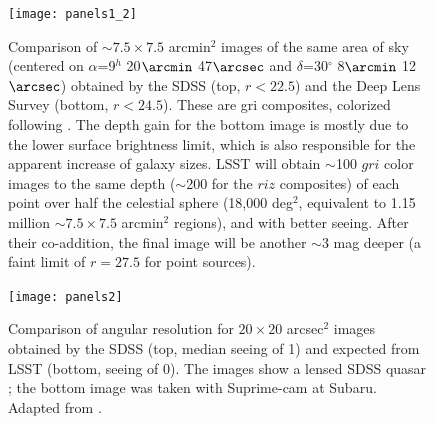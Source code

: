 \begin{figure}
\begin{center}
\texttt{[image: panels1\_2]}
\end{center}
\caption{Comparison of $\sim7.5\times7.5$ arcmin$^2$ images of
the same area of sky (centered on $\alpha$=9$^h$ 20$\arcmin$ 47$\arcsec$ and
$\delta$=30$^\circ$ 8$\arcmin$ 12$\arcsec$) obtained by the SDSS (top, $r<22.5$) and
the Deep Lens Survey (bottom, $r<24.5$). These are gri composites,
colorized following \citet{2004PASP..116..133L}.  The depth gain for the bottom image
is mostly due to the lower surface brightness limit, which is also responsible
for the apparent increase of galaxy sizes. LSST will obtain $\sim$100 $gri$
color images to the same depth ($\sim$200 for the $riz$ composites) of each point
over half the celestial sphere (18,000 deg$^2$, equivalent to 1.15 million $\sim7.5\times7.5$
arcmin$^2$ regions), and with better seeing. After their co-addition, the final
image will be another $\sim3$ mag deeper (a faint limit of $r=27.5$ for point
sources).}
\label{Fig:panels1}
\end{figure}

\begin{figure}
\begin{center}
\texttt{[image: panels2]}
\end{center}
\caption{Comparison of angular resolution for $20\times20$ arcsec$^2$ images obtained
by the SDSS (top, median seeing of 1) and expected from LSST (bottom,
seeing of 0). The images show a lensed SDSS quasar
\citep[SDSS J1332+0347;][]{2007AJ....133..214M}; the bottom image was taken with Suprime-cam at Subaru.
Adapted from \citet{2007AAS...21113707B}.}
\label{Fig:panels2}
\end{figure}
